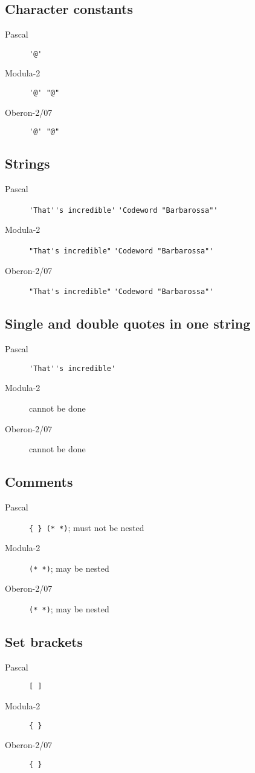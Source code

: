 \documentclass[10pt]{article}
\begin{document}
\subsection{Character constants}
\begin{description}
    \item[Pascal] \lstinline!'@'! 
    \item[Modula-2] \lstinline!'@' "@"! 
    \item[Oberon-2/07] \lstinline!'@' "@"! 
\end{description}

\subsection{Strings}
\begin{description}
    \item[Pascal] \lstinline!'That''s incredible'! \lstinline!'Codeword "Barbarossa"'!
    \item[Modula-2] \lstinline!"That's incredible"! \lstinline!'Codeword "Barbarossa"'!
    \item[Oberon-2/07] \lstinline!"That's incredible"! \lstinline!'Codeword "Barbarossa"'!
\end{description}

\subsection{Single and double quotes in one string}
\begin{description}
    \item[Pascal] \lstinline!'That''s incredible'!
    \item[Modula-2] cannot be done 
    \item[Oberon-2/07] cannot be done 
\end{description}

\subsection{Comments}
\begin{description}
    \item[Pascal] \lstinline!{ } (* *)!; must not be nested
    \item[Modula-2] \lstinline!(* *)!; may be nested
    \item[Oberon-2/07] \lstinline!(* *)!; may be nested
\end{description}

\subsection{Set brackets}
\begin{description}
    \item[Pascal] \lstinline![ ]!
    \item[Modula-2] \lstinline!{ }!
    \item[Oberon-2/07] \lstinline!{ }!
\end{description}
\end{document}
